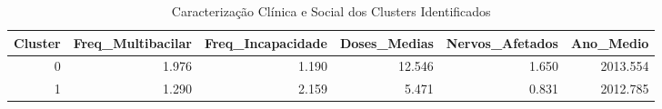 \begin{table}
\caption{Caracterização Clínica e Social dos Clusters Identificados}
\label{tab:perfil_clusters}
\begin{tabular}{rrrrrr}
\toprule
Cluster & Freq_Multibacilar & Freq_Incapacidade & Doses_Medias & Nervos_Afetados & Ano_Medio \\
\midrule
0 & 1.976 & 1.190 & 12.546 & 1.650 & 2013.554 \\
1 & 1.290 & 2.159 & 5.471 & 0.831 & 2012.785 \\
\bottomrule
\end{tabular}
\end{table}
